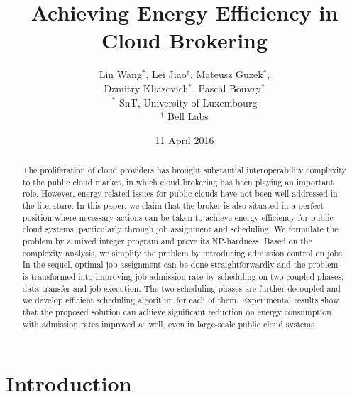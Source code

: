 \documentclass{article}
\begin{document}
\title{Achieving Energy Efficiency in Cloud Brokering}


\author{Lin Wang$^\ast$, Lei Jiao$^\dagger$, Mateusz Guzek$^\ast$, \\Dzmitry Kliazovich$^\ast$, Pascal Bouvry$^\ast$ \vspace{0.15cm} \\
$^\ast$ SnT, University of Luxembourg \\$^\dagger$ Bell Labs
}
\date{11 April 2016}


\maketitle
\begin{abstract}
The proliferation of cloud providers has brought substantial interoperability complexity to the public cloud market, in which cloud brokering has been playing an important role. However, energy-related issues for public clouds have not been well addressed in the literature. In this paper, we claim that the broker is also situated in a perfect position where necessary actions can be taken to achieve energy efficiency for public cloud systems, particularly through job assignment and scheduling. We formulate the problem by a mixed integer program and prove its NP-hardness. Based on the complexity analysis, we simplify the problem by introducing admission control on jobs. In the sequel, optimal job assignment can be done straightforwardly and the problem is transformed into improving job admission rate by scheduling on two coupled phases: data transfer and job execution. The two scheduling phases are further decoupled and we develop efficient scheduling algorithm for each of them. Experimental results show that the proposed solution can achieve significant reduction on energy consumption with admission rates improved as well, even in large-scale public cloud systems.

\end{abstract}







\section{Introduction}
\label{sec:intro}
\end{document}
